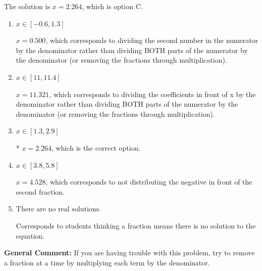 \documentclass{extbook}[14pt]
\begin{document}
\begin{enumerate}
{The solution is \( x = 2.264 \), which is option C.\begin{enumerate}[label=\Alph*.]
\item \( x \in [-0.6, 1.3] \)

 $x = 0.500$, which corresponds to dividing the second number in the numerator by the denominator rather than dividing BOTH parts of the numerator by the denominator (or removing the fractions through multiplication).
\item \( x \in [11, 11.4] \)

 $x = 11.321$, which corresponds to dividing the coefficients in front of x by the denominator rather than dividing BOTH parts of the numerator by the denominator (or removing the fractions through multiplication).
\item \( x \in [1.3, 2.9] \)

* $x = 2.264$, which is the correct option.
\item \( x \in [3.8, 5.8] \)

 $x = 4.528$, which corresponds to not distributing the negative in front of the second fraction.
\item \( \text{There are no real solutions.} \)

Corresponds to students thinking a fraction means there is no solution to the equation.
\end{enumerate}

\textbf{General Comment:} If you are having trouble with this problem, try to remove a fraction at a time by multiplying each term by the denominator.
}
\end{enumerate}
\end{document}

